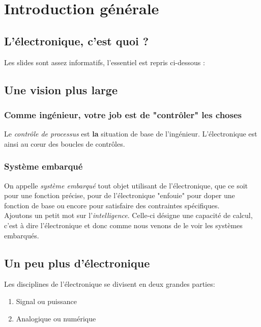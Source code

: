 \chapter{Introduction générale}
\section{L'électronique, c'est quoi ?}
Les slides sont assez informatifs, l'essentiel est repris ci-dessous :\\



\section{Une vision plus large}
\subsection{Comme ingénieur, votre job est de "contrôler" les choses}
Le \textit{contrôle de processus} est \textbf{la} situation de base
de l'ingénieur. L'électronique est ainsi au cœur des boucles de 
contrôles.

\subsection{Système embarqué}
On appelle \textit{système embarqué} tout objet utilisant de l'électronique, que ce soit pour une fonction précise, pour de l'électronique "enfouie" pour doper une fonction de base ou encore
pour satisfaire des contraintes spécifiques.\\

Ajoutons un petit mot sur l'\textit{intelligence}. Celle-ci désigne
une capacité de calcul, c'est à dire l'électronique et donc comme
nous venons de le voir les systèmes embarqués.


\section{Un peu plus d'électronique}
Les disciplines de l'électronique se divisent en deux grandes parties:
\begin{enumerate}
	\item Signal ou puissance
	\item Analogique ou numérique
\end{enumerate}

